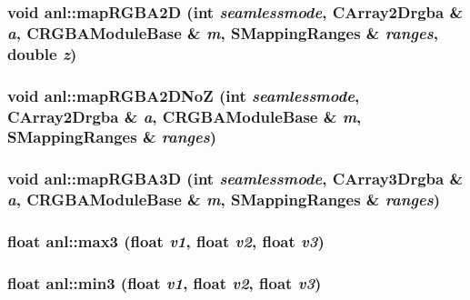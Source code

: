 \label{namespaceanl_a3b9cec8b101907ef6fd902f040fbc6dd}
\hypertarget{namespaceanl_a3371cb5d5b55f78d610fd9e52586f2be}{
\subsubsection[{mapRGBA2D}]{\setlength{\rightskip}{0pt plus 5cm}void anl::mapRGBA2D (int {\em seamlessmode}, \/  {\bf CArray2Drgba} \& {\em a}, \/  CRGBAModuleBase \& {\em m}, \/  SMappingRanges \& {\em ranges}, \/  double {\em z})}}
\label{namespaceanl_a3371cb5d5b55f78d610fd9e52586f2be}
\hypertarget{namespaceanl_aa7bd5fe8cce5c826db1307de720396c5}{
\subsubsection[{mapRGBA2DNoZ}]{\setlength{\rightskip}{0pt plus 5cm}void anl::mapRGBA2DNoZ (int {\em seamlessmode}, \/  {\bf CArray2Drgba} \& {\em a}, \/  CRGBAModuleBase \& {\em m}, \/  SMappingRanges \& {\em ranges})}}
\label{namespaceanl_aa7bd5fe8cce5c826db1307de720396c5}
\hypertarget{namespaceanl_a2d90ac45f459600dc84db21e6f880587}{
\subsubsection[{mapRGBA3D}]{\setlength{\rightskip}{0pt plus 5cm}void anl::mapRGBA3D (int {\em seamlessmode}, \/  {\bf CArray3Drgba} \& {\em a}, \/  CRGBAModuleBase \& {\em m}, \/  SMappingRanges \& {\em ranges})}}
\label{namespaceanl_a2d90ac45f459600dc84db21e6f880587}
\hypertarget{namespaceanl_ab6cc5977273479cbb6311b8cd5eb603e}{
\subsubsection[{max3}]{\setlength{\rightskip}{0pt plus 5cm}float anl::max3 (float {\em v1}, \/  float {\em v2}, \/  float {\em v3})}}
\label{namespaceanl_ab6cc5977273479cbb6311b8cd5eb603e}
\hypertarget{namespaceanl_a977bc8430a8d2d5ef7a2c66d9f91cc86}{
\subsubsection[{min3}]{\setlength{\rightskip}{0pt plus 5cm}float anl::min3 (float {\em v1}, \/  float {\em v2}, \/  float {\em v3})}}
